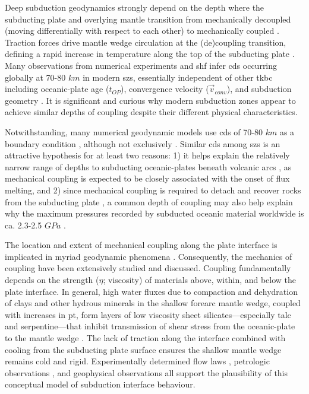 Deep subduction geodynamics strongly depend on the depth where the subducting plate and overlying mantle transition from mechanically decoupled (moving differentially with respect to each other) to mechanically coupled \citep[moving with the same local velocity,][]{Furukawa1993, Peacock1994, Wada2008}. Traction forces drive mantle wedge circulation at the (de)coupling transition, defining a rapid increase in temperature along the top of the subducting plate \citep{Peacock1996}. Many observations from numerical experiments and \gls{shf} infer \glspl{cd} occurring globally at 70-80 \(km\) in modern \glspl{sz}, essentially independent of other \gls{tkbc} including oceanic-plate age (\(t_{OP}\)), convergence velocity (\(\vec{v}_{conv}\)), and subduction geometry \citep{Furukawa1993, Wada2008, Wada2009}. It is significant and curious why modern subduction zones appear to achieve similar depths of coupling despite their different physical characteristics.

Notwithstanding, many numerical geodynamic models use \glspl{cd} of 70-80 \(km\) as a boundary condition \citep[e.g.,][]{Abers2017, Currie2004, Syracuse2010, VanKeken2011, VanKeken2018, Wada2012, Gao2014, Wilson2014}, although not exclusively \citep[e.g.~40-56 \(km\),][]{England2010, Peacock1996}. Similar \glspl{cd} among \glspl{sz} is an attractive hypothesis for at least two reasons: 1) it helps explain the relatively narrow range of depths to subducting oceanic-plates beneath volcanic arcs \citep{England2004, Syracuse2006}, as mechanical coupling is expected to be closely associated with the onset of flux melting, and 2) since mechanical coupling is required to detach and recover rocks from the subducting plate \citep{Agard2016}, a common depth of coupling may also help explain why the maximum pressures recorded by subducted oceanic material worldwide is ca. 2.3-2.5 \(GPa\) \citep[roughly 80 \(km\),][]{Agard2009}.

The location and extent of mechanical coupling along the plate interface is implicated in myriad geodynamic phenomena \citep[seismicity, metamorphism, volatile fluxes into the mantle wedge, volcanism, and plate motions, e.g.,][]{Cizkova2013, Gonzalez2016, Peacock1990, Peacock1991, Peacock1993, Peacock1996, Peacock1999a, Hacker2003, VanKeken2011, Grove2012, Gao2017}. Consequently, the mechanics of coupling have been extensively studied and discussed. Coupling fundamentally depends on the strength (\(\eta\); viscosity) of materials above, within, and below the plate interface. In general, high water fluxes due to compaction and dehydration of clays and other hydrous minerals in the shallow forearc mantle wedge, coupled with increases in \gls{pt}, form layers of low viscosity sheet silicates---especially talc and serpentine---that inhibit transmission of shear stress from the oceanic-plate to the mantle wedge \citep{Peacock1999a}. The lack of traction along the interface combined with cooling from the subducting plate surface ensures the shallow mantle wedge remains cold and rigid. Experimentally determined flow laws \citep[e.g.,][]{Agard2016}, petrologic observations \citep[e.g.,][]{Agard2016}, and geophysical observations \citep[e.g.,][]{Gao2014, Peacock1999a} all support the plausibility of this conceptual model of subduction interface behaviour.

